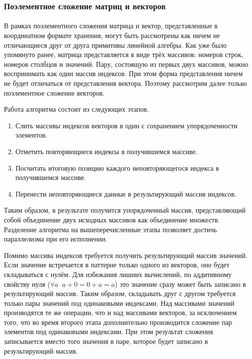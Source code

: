 \documentclass[14pt]{matmex-diploma-custom}
\begin{document}
\subsubsection{Поэлементное сложение матриц и векторов}
\paragraph{}В рамках поэлементного сложения матрица и вектор, представленные в координатном формате хранения, могут быть рассмотрены как ничем не отличающиеся друг от друга примитивы линейной алгебры. Как уже было упомянуто ранее, матрица представляется в виде трёх массивов: номеров строк, номеров столбцов и значений. Пару, состоящую из первых двух массивов, можно воспринимать как один массив индексов. При этом форма представления ничем не будет отличаться от представления вектора. Поэтому рассмотрим далее только поэлементное сложение векторов.

Работа алгоритма состоит из следующих этапов.
\begin{enumerate}
    \item Слить массивы индексов векторов в один с сохранением упорядоченности элементов.
    \item Отметить повторяющиеся индексы в получившемся массиве.
    \item Посчитать итоговую позицию каждого неповторяющегося индекса в получившемся массиве.
    \item Перенести неповторяющиеся данные в результирующий массив индексов.
\end{enumerate}

Таким образом, в результате получится упорядоченный массив, представляющий собой объединение двух исходных массивов как объединение множеств. Разделение алгоритма на вышеперечисленные этапы позволяет достичь параллелизма при его исполнении.

Помимо массива индексов требуется получить результирующий массив значений. Если значение встречается в паттерне только одного из векторов, оно будет складываться с нулём. Для избежания лишних вычислений, по аддитивному свойству нуля (\(\forall{}a\;\;a+0=0+a=a\)) это значение сразу может быть записано в результирующий массив. Таким образом, складывать друг с другом требуется только пары значений под одинаковыми индексами. Над массивами значений производятся те же операции, что и над массивами векторов, за исключением того, что во время второго этапа дополнительно производится сложение пар элементов под одинаковыми индексами. При этом результат сложения записывается вместо того значения в паре, которое будет записано в результирующий массив.
\end{document}
